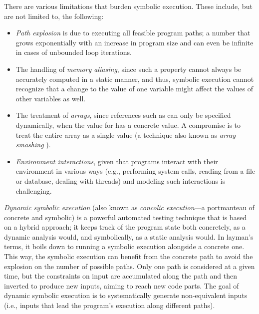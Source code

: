 There are various limitations that burden symbolic execution. These include, but are not limited to, the following:
\begin{itemize}
\item \emph{Path explosion} is due to executing all feasible program paths; a number that grows exponentially with an increase in program size and can even be infinite in cases of unbounded loop iterations.

\item The handling of \emph{memory aliasing}, since such a property cannot always be accurately computed in a static manner, and thus, symbolic execution cannot recognize that a change to the value of one variable might affect the values of other variables as well.

\item The treatment of \emph{arrays}, since references such as  can only be specified dynamically, when the value for  has a concrete value. A compromise is to treat the entire array as a single value (a technique also known as \emph{array smashing} \todo{}).

\item \emph{Environment interactions}, given that programs interact with their environment in various ways (e.g., performing system calls, reading from a file or database, dealing with threads) and modeling such interactions is challenging.
\end{itemize}

\emph{Dynamic symbolic execution} (also known as \emph{concolic execution}---a portmanteau of concrete and symbolic) is a powerful automated testing technique that is based on a hybrid approach; it keeps track of the program state both concretely, as a dynamic analysis would, and symbolically, as a static analysis would. In layman's terms, it boils down to running a symbolic execution alongside a concrete one. This way, the symbolic execution can benefit from the concrete path to avoid the explosion on the number of possible paths. Only one path is considered at a given time, but the constraints on input are accumulated along the path and then inverted to produce new inputs, aiming to reach new code parts. The goal of dynamic symbolic execution is to systematically generate non-equivalent inputs (i.e., inputs that lead the program’s execution along different paths).

